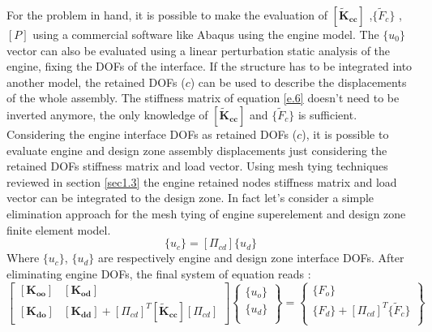 For the problem in hand,  it is possible to make the evaluation of $ \left[ \mathbf{\tilde{K}_{cc}}\right]$ ,$\lbrace \tilde{F}_c \rbrace$ , $\left[ P\right]$ using a commercial software like Abaqus using the engine model. 
The $\lbrace u_0 \rbrace$ vector can also be evaluated using a linear perturbation static analysis of the engine, fixing the DOFs of the interface. If the structure has to be integrated into another model, the retained DOFs ($c$) can be used to describe the displacements of the whole assembly. The stiffness matrix of equation \ref{e.6} doesn't need to be inverted anymore, the only knowledge of $\left[\mathbf{\tilde{K}_{cc}}\right]$ and $\lbrace \tilde{F}_c \rbrace$ is sufficient.
Considering the engine interface DOFs as retained DOFs ($c$), it is possible to evaluate engine and design zone assembly displacements just considering the retained DOFs stiffness matrix and load vector. Using mesh tying techniques reviewed in section \ref{sec1.3} the engine retained nodes stiffness matrix and load vector can be integrated to the design zone.
In fact let's consider a simple elimination approach for the mesh tying of engine superelement and design zone finite element model.
  \begin{equation}
    \lbrace u_c \rbrace = \left[ \Pi_{cd} \right] \lbrace u_{d}\rbrace
    \end{equation}
Where $\lbrace u_c \rbrace$, $\lbrace u_{d}\rbrace $ are respectively engine and design zone interface DOFs.
After eliminating engine DOFs, the final system of equation reads :
    \begin{equation}
    \label{eq.1.119}
    \left[ \begin{array}{cc}
    \left[ \mathbf{K_{oo}} \right] & \left[ \mathbf{K_{od}} \right]\\
    \left[ \mathbf{K_{do}} \right] & \left[ \mathbf{K_{dd}} \right]+\left[ \Pi_{cd} \right]^T\left[ \mathbf{\tilde{K}_{cc}} \right]\left[ \Pi_{cd} \right]
    \end{array} \right] \left\lbrace \begin{array}{c}
    \lbrace u_o \rbrace\\
    \lbrace u_d \rbrace\\
    \end{array}\right\rbrace =  \left\lbrace \begin{array}{c}
    \lbrace F_o \rbrace\\
    \lbrace F_d\rbrace+\left[ \Pi_{cd} \right]^T\lbrace \tilde{F}_c\rbrace\\
    \end{array}\right\rbrace
    \end{equation} 
